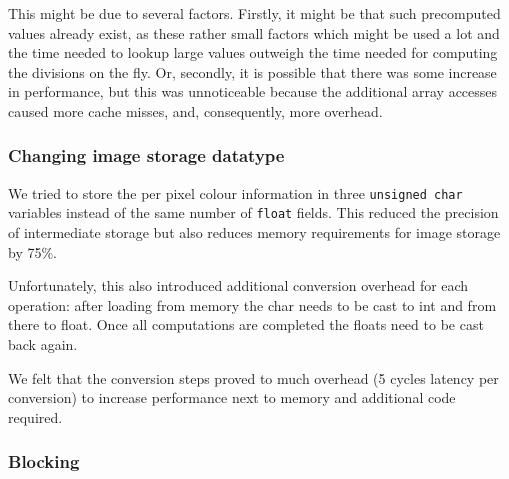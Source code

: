 %
%

This might be due to several factors.
Firstly, it might be that such precomputed values already exist, as these rather small factors which might be used a lot and the time needed to lookup large values outweigh the time needed for computing the divisions on the fly. Or, secondly, it is possible that there was some increase in performance, but this was unnoticeable because the additional array accesses caused more cache misses, and, consequently, more overhead.

\subsubsection{Changing image storage datatype}

We tried to store the per pixel colour information in three \texttt{unsigned char} variables instead of the same number of \texttt{float} fields. This reduced the precision of intermediate storage but also reduces memory requirements for image storage by 75\%.
 
Unfortunately, this also introduced additional conversion overhead for each operation: after loading from memory the char needs to be cast to int and from there to float. Once all computations are completed the floats need to be cast back again. 

We felt that the conversion steps proved to much overhead (5 cycles latency per conversion) to increase performance next to memory and additional code required.

\subsubsection{Blocking}

